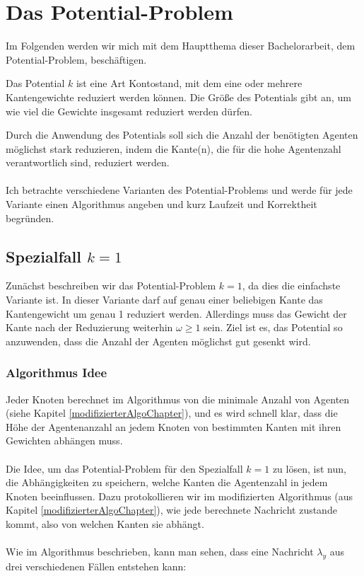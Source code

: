 \section{Das Potential-Problem}\label{kap_pot}

Im Folgenden werden wir mich mit dem Hauptthema dieser Bachelorarbeit, dem Potential-Problem, beschäftigen.

\begin{mydef}\label{def_potential}
	Das Potential $k$ ist eine Art Kontostand, mit dem eine oder mehrere Kantengewichte reduziert werden können. Die Größe des Potentials gibt an, um wie viel die Gewichte insgesamt reduziert werden dürfen. 
\end{mydef}
Durch die Anwendung des Potentials soll sich die Anzahl der benötigten Agenten möglichst stark reduzieren, indem die Kante(n), die für die hohe Agentenzahl verantwortlich sind, reduziert werden.
\\
\\
Ich betrachte verschiedene Varianten des Potential-Problems und werde für jede Variante einen Algorithmus angeben und kurz Laufzeit und Korrektheit begründen.

\subsection{Spezialfall $k = 1$}\label{kap_pot=1}

Zunächst beschreiben wir das Potential-Problem $k = 1$, da dies die einfachste Variante ist. In dieser Variante darf auf genau einer beliebigen Kante das Kantengewicht um genau 1 reduziert werden. Allerdings muss das Gewicht der Kante nach der Reduzierung weiterhin $\omega \geq 1$ sein. Ziel ist es, das Potential so anzuwenden, dass die Anzahl der Agenten möglichst gut gesenkt wird.


\subsubsection{Algorithmus Idee}

Jeder Knoten berechnet im Algorithmus von \cite{cima_paper} die minimale Anzahl von Agenten (siehe Kapitel \ref{modifizierterAlgoChapter}), und es wird schnell klar, dass die Höhe der Agentenanzahl an jedem Knoten von bestimmten Kanten mit ihren Gewichten abhängen muss.
\\
\\
Die Idee, um das Potential-Problem für den Spezialfall $k = 1$ zu lösen, ist nun, die Abhängigkeiten zu speichern, welche Kanten die Agentenzahl in jedem Knoten beeinflussen. Dazu protokollieren wir im modifizierten Algorithmus (aus Kapitel \ref{modifizierterAlgoChapter}), wie jede berechnete Nachricht zustande kommt, also von welchen Kanten sie abhängt.
\\
\\ 
Wie im Algorithmus beschrieben, kann man sehen, dass eine Nachricht $\lambda_{y}$ aus drei verschiedenen Fällen entstehen kann:


